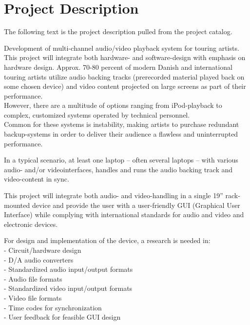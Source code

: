 \chapter{Project Description}
The following text is the project description pulled from the project catalog. \newline

Development of multi-channel audio/video playback system for touring artists. This project will
integrate both hardware- and software-design with emphasis on hardware design.
Approx. 70-80 percent of modern Danish and international touring artists utilize audio backing tracks
(prerecorded material played back on some chosen device) and video content projected on large
screens as part of their performance. \\
However, there are a multitude of options ranging from iPod-playback to complex, customized
systems operated by technical personnel. \\
Common for these systems is instability, making artists to purchase redundant backup-systems in
order to deliver their audience a flawless and uninterrupted performance. \newline

In a typical scenario, at least one laptop – often several laptops – with various audio- and/or videointerfaces, handles and runs the audio backing track and video-content in sync. \newline

This project will integrate both audio- and video-handling in a single 19” rack-mounted device and
provide the user with a user-friendly GUI (Graphical User Interface) while complying with
international standards for audio and video and electronic devices. \newline

For design and implementation of the device, a research is needed in: \\
- Circuit/hardware design \\
- D/A audio converters \\
- Standardized audio input/output formats \\
- Audio file formats \\
- Standardized video input/output formats \\
- Video file formats \\
- Time codes for synchronization \\
- User feedback for feasible GUI design \newline

